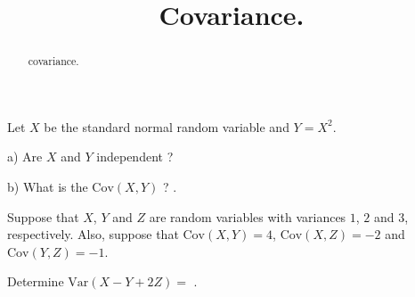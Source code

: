 \documentclass{ximera}
\title{Covariance.}
\begin{document}
\begin{abstract}
covariance.
\end{abstract}
\maketitle

Let $X$ be the standard normal random variable and $Y=X^{2}$.

\begin{question} 
     \begin{solution}
          a) Are $X$ and $Y$ independent ?
          \begin{multiple-choice}
          \end{multiple-choice} 
     \end{solution}
\end{question}

\begin{question}
     \begin{solution}
          b) What is the $\text{Cov}(X,Y)$ ?  .
     \end{solution}
\end{question}

Suppose that $X$, $Y$ and $Z$ are random variables with variances $1$, $2$ and $3$, respectively. Also, suppose that $\text{Cov}(X,Y)=4$, $\text{Cov}(X,Z)=-2$ and $\text{Cov}(Y,Z)=-1$.

\begin{question}
     \begin{solution}
     Determine $\text{Var}(X-Y+2Z) = $ .
     \end{solution}
\end{question}
\end{document}
